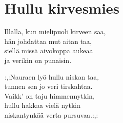 \section{Hullu kirvesmies}

Illalla, kun mielipuoli kirveen saa,\\
hän johdattaa mut aitan taa,\\
siellä missä aivokoppa aukeaa\\
ja verikin on punaisin.

:,:Nauraen lyö hullu niskan taa,\\
tunnen sen jo veri tirskahtaa.\\
Vaikk’ on taju himmennytkin,\\
hullu hakkaa vielä nytkin\\
niskantynkää verta pursuvaa.:,:
